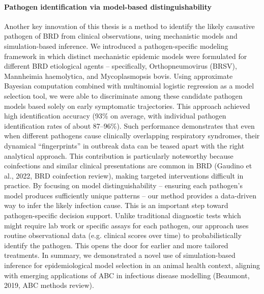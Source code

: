 \paragraph{Pathogen identification via model-based distinguishability} Another key innovation of this thesis is a method to identify the likely causative pathogen of BRD from clinical observations, using mechanistic models and simulation-based inference. We introduced a pathogen-specific modeling framework in which distinct mechanistic epidemic models were formulated for different BRD etiological agents – specifically, Orthopneumovirus (BRSV), Mannheimia haemolytica, and Mycoplasmopsis bovis. Using approximate Bayesian computation combined with multinomial logistic regression as a model selection tool, we were able to discriminate among these candidate pathogen models based solely on early symptomatic trajectories. This approach achieved high identification accuracy (93\% on average, with individual pathogen identification rates of about 87–96\%). Such performance demonstrates that even when different pathogens cause clinically overlapping respiratory syndromes, their dynamical “fingerprints” in outbreak data can be teased apart with the right analytical approach. This contribution is particularly noteworthy because coinfections and similar clinical presentations are common in BRD (Gaudino et al., 2022, BRD coinfection review), making targeted interventions difficult in practice. By focusing on model distinguishability – ensuring each pathogen’s model produces sufficiently unique patterns – our method provides a data-driven way to infer the likely infection cause. This is an important step toward pathogen-specific decision support. Unlike traditional diagnostic tests which might require lab work or specific assays for each pathogen, our approach uses routine observational data (e.g. clinical scores over time) to probabilistically identify the pathogen. This opens the door for earlier and more tailored treatments. In summary, we demonstrated a novel use of simulation-based inference for epidemiological model selection in an animal health context, aligning with emerging applications of ABC in infectious disease modelling (Beaumont, 2019, ABC methods review).

